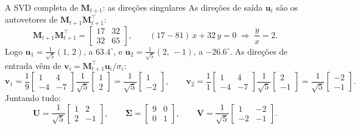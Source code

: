 \documentclass[aspectratio=169,xcolor=dvipsnames]{beamer}
\begin{document}
  \begin{frame}{A SVD completa de $\mathbf{M}_{t+1}$: as direções singulares}
    As direções de saída $\mathbf{u}_i$ são os autovetores de $\mathbf{M}_{t+1}\mathbf{M}_{t+1}^{\top}$:
    \[
      \mathbf{M}_{t+1}\mathbf{M}_{t+1}^{\top}=\begin{bmatrix}17&32\\32&65\end{bmatrix},
      \qquad
      (17-81)\,x+32\,y=0
      \;\Longrightarrow\;
      \frac{y}{x}=2.
    \]
    Logo $\mathbf{u}_1=\tfrac{1}{\sqrt{5}}(1,\,2)$, a $63.4^{\circ}$, e $\mathbf{u}_2=\tfrac{1}{\sqrt{5}}(2,\,-1)$, a $-26.6^{\circ}$.
    As direções de entrada vêm de $\mathbf{v}_i=\mathbf{M}_{t+1}^{\top}\mathbf{u}_i/\sigma_i$:
    \[
      \mathbf{v}_1=\frac{1}{9}\begin{bmatrix}1&4\\-4&-7\end{bmatrix}\frac{1}{\sqrt{5}}\begin{bmatrix}1\\2\end{bmatrix}
      =\frac{1}{\sqrt{5}}\begin{bmatrix}1\\-2\end{bmatrix},
      \qquad
      \mathbf{v}_2=\frac{1}{1}\begin{bmatrix}1&4\\-4&-7\end{bmatrix}\frac{1}{\sqrt{5}}\begin{bmatrix}2\\-1\end{bmatrix}
      =\frac{1}{\sqrt{5}}\begin{bmatrix}-2\\-1\end{bmatrix}.
    \]
    Juntando tudo:
    \[
      \mathbf{U}=\frac{1}{\sqrt{5}}\begin{bmatrix}1&2\\2&-1\end{bmatrix},
      \qquad
      \boldsymbol{\Sigma}=\begin{bmatrix}9&0\\0&1\end{bmatrix},
      \qquad
      \mathbf{V}=\frac{1}{\sqrt{5}}\begin{bmatrix}1&-2\\-2&-1\end{bmatrix}.
    \]
  \end{frame}
\end{document}
